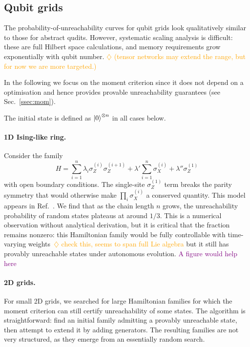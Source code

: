 \documentclass[aps,prx,reprint,superscriptaddress,footnote, twocolumn,notitlepage]{revtex4-2}
\newcommand{\ko}[1]{\textcolor{orange}{#1}}
\newcommand{\ph}[1]{\textcolor{purple}{#1}}
\newcommand{\todoko}[1]{\ko{$\diamondsuit$ #1}}
\begin{document}
\subsection{Qubit grids}

The probability-of-unreachability curves for qubit grids look qualitatively similar to those for abstract qudits. However, systematic scaling analysis is difficult: these are full Hilbert space calculations, and memory requirements grow exponentially with qubit number. \todoko{(tensor networks may extend the  range, but for now we are more targeted.)}

In the following we focus on the moment criterion since it does not depend on a optimisation and hence provides provable unreachability guarantees (see Sec.~\ref{ssec:mom}). 

The initial state is defined as $\ket{0}^{\otimes n}$ in all cases below.

\paragraph{1D Ising-like ring.}
Consider the family
\begin{equation}
H = \sum_{i=1}^n \lambda_i \sigma_Z^{(i)} \sigma_Z^{(i+1)} + \lambda' \sum_{i=1}^n \sigma_X^{(i)} + \lambda'' \sigma_Z^{(1)}
\end{equation}
with open boundary conditions. The single-site $\sigma_Z^{(1)}$ term breaks the parity symmetry that would otherwise make $\prod_i \sigma_X^{(i)}$ a conserved quantity. This model appears in Ref.~\cite{whitty_quantum_2025}. We find that as the chain length $n$ grows, the unreachability probability of random states plateaus at around $1/3$. This is a numerical observation without analytical derivation,  but it is critical that the fraction remains nonzero: this Hamiltonian family would be fully controllable with time-varying weights~\todoko{check this, seems to span full Lie algebra} but it still has provably unreachable states under autonomous evolution.
\ph{A figure would help here}

\paragraph{2D grids.}
For small 2D grids, we searched for large Hamiltonian families for which the moment criterion can still certify unreachability of some states. The algorithm is straightforward: find an initial family admitting a provably unreachable state, then attempt to extend it by adding generators. The resulting families are not very structured, as they emerge from an essentially random search.
\end{document}

